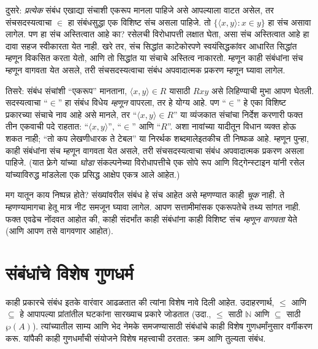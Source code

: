 \documentclass[11pt,a4paper,openany]{book}
\theoremstyle{definition}
\newcommand{\Setabs}[2]{\{#1:#2\}}
\newcommand{\Pow}[1]{\wp(#1)}
\newcommand{\tuple}[1]{\langle #1\rangle}
\newcommand{\Nat}{\mathbb{N}}
\newenvironment{intro}{}{}
\begin{document}
दुसरे: \emph{प्रत्येक} संबंध एखाद्या संचाशी एकरूप मानला पाहिजे असे आपल्याला
वाटत असेल, तर संचसदस्यत्वाचा $\in$ हा संबंधसुद्धा एक विशिष्ट संच असला
पाहिजे. तो $\Setabs{\tuple{x,y}}{x \in y}$ हा संच असावा लागेल. पण हा
संच अस्तित्वात आहे का? रसेलची विरोधापत्ती लक्षात घेता, असा संच अस्तित्वात
आहे हा दावा सहज स्वीकारता येत नाही. खरे तर,
संच सिद्धांत
काटेकोरपणे स्वयंसिद्धकांवर आधारित सिद्धांत म्हणून विकसित करता येतो,
आणि तो सिद्धांत या संचाचे अस्तित्व नाकारतो.
म्हणून काही संबंधांना संच म्हणून वागवता येत असले, तरी संचसदस्यत्वाचा
संबंध अपवादात्मक प्रकरण म्हणून घ्यावा लागेल.

तिसरे: संबंध संचांशी ``एकरूप'' मानताना, $\tuple{x,y} \in R$ यासाठी
$Rxy$ असे लिहिण्याची मुभा आपण घेतली. सदस्यत्वाचा ``$\in$'' हा संबंध
विधेय \emph{म्हणून} वापरला, तर हे योग्य आहे. पण ``$\in$'' हे एका
विशिष्ट प्रकारच्या संचाचे नाव आहे असे मानले, तर ``$\tuple{x,y} \in R$''
या व्यंजकात संचांचा निर्देश करणारी फक्त तीन एकवाची पदे राहतात:
``$\tuple{x,y}$'', ``$\in$'' आणि ``$R$''. अशा नावांच्या यादीतून विधान
व्यक्त होऊ शकत नाही; ``तो कप लेखणीधारक ते टेबल'' या निरर्थक शब्दमालेइतकीच
ती निष्फळ आहे. म्हणून पुन्हा, काही संबंधांना संच म्हणून वागवता येत असले,
तरी संचसदस्यत्वाचा संबंध अपवादात्मक प्रकरण असला पाहिजे. (यात फ्रेगे यांच्या
\emph{घोडा} संकल्पनेच्या विरोधापत्तीचे एक सोपे रूप आणि विट्गेन्स्टाइन यांनी
रसेल यांच्याविरुद्ध मांडलेला एक प्रसिद्ध आक्षेप एकत्र आले आहेत.)

मग यातून काय निष्पन्न होते? संख्यांवरील संबंध हे संच आहेत असे म्हणण्यात
काही \emph{चूक} नाही. ते म्हणण्यामागचा हेतू मात्र नीट समजून घ्यावा लागेल.
आपण सत्तामीमांसक एकरूपतेचे तथ्य सांगत नाही. फक्त एवढेच नोंदवत आहोत की,
काही संदर्भांत काही संबंधांना काही विशिष्ट संच \emph{म्हणून वागवता}
येते (आणि आपण तसे वागवणार आहोत).











\section{संबंधांचे विशेष गुणधर्म}\label{sfr:rel:prp:sec}

\begin{intro}
काही प्रकारचे संबंध इतके वारंवार आढळतात की त्यांना विशेष नावे दिली
आहेत. उदाहरणार्थ, $\le$ आणि $\subseteq$ हे आपापल्या प्रांतांतील घटकांना
सारख्याच प्रकारे जोडतात (उदा., $\le$ साठी $\Nat$ आणि $\subseteq$ साठी
$\Pow{A}$). त्यांच्यातील साम्य आणि भेद नेमके समजण्यासाठी संबंधांचे काही
विशेष गुणधर्मांनुसार वर्गीकरण करू. यांपैकी काही गुणधर्मांची संयोजने विशेष
महत्त्वाची ठरतात: क्रम आणि तुल्यता संबंध.
\end{intro}
\end{document}

